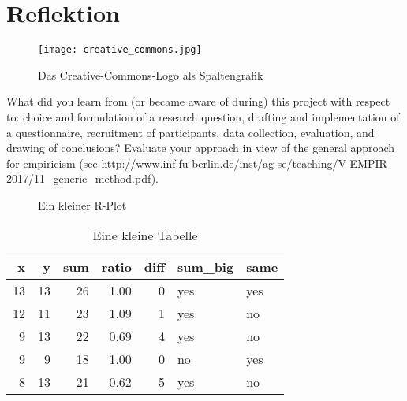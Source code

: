 \documentclass[de]{agse-empir-report}\usepackage[]{graphicx}\usepackage[]{color}
\makeatletter
\newenvironment{kframe}{%
 \def\at@end@of@kframe{}%
 \ifinner\ifhmode%
  \def\at@end@of@kframe{\end{minipage}}%
  \begin{minipage}{\columnwidth}%
 \fi\fi%
 \def\FrameCommand##1{\hskip\@totalleftmargin \hskip-\fboxsep
 \colorbox{shadecolor}{##1}\hskip-\fboxsep
     \hskip-\linewidth \hskip-\@totalleftmargin \hskip\columnwidth}%
 \MakeFramed {\advance\hsize-\width
   \@totalleftmargin\z@ \linewidth\hsize
   \@setminipage}}%
 {\par\unskip\endMakeFramed%
 \at@end@of@kframe}
\newenvironment{knitrout}{}{} %
\makeatother
\begin{document}
\lipsum[9-10]


\section[kk]{Reflektion} \label{sec:reflektion}

\begin{figure}
    \texttt{[image: creative\_commons.jpg]}
    \caption{Das Creative-Commons-Logo als Spaltengrafik}
\end{figure}

What did you learn from (or became aware of during) this project with
respect to: choice and formulation of a research question,
drafting and implementation of a questionnaire,
recruitment of participants,
data collection, evaluation, and drawing of conclusions?
Evaluate your approach in view of the general approach for
empiricism (see
\url{http://www.inf.fu-berlin.de/inst/ag-se/teaching/V-EMPIR-2017/11_generic_method.pdf}).

\lipsum[11-13]

\begin{figure}
\begin{knitrout}
\color{fgcolor}\begin{kframe}


{\ttfamily\noindent\bfseries{}}

{\ttfamily\noindent\bfseries{}}

{\ttfamily\noindent\bfseries\color{errorcolor}{\#\# Error in print(plt): Objekt 'plt' nicht gefunden}}\end{kframe}
\end{knitrout}
    \caption{Ein kleiner R-Plot}
\end{figure}

\begin{table}
    \centering
\begin{knitrout}
\color{fgcolor}
\begin{tabular}{rrrrrll}
\toprule
x & y & sum & ratio & diff & sum\_big & same\\
\midrule
13 & 13 & 26 & 1.00 & 0 & yes & yes\\
12 & 11 & 23 & 1.09 & 1 & yes & no\\
9 & 13 & 22 & 0.69 & 4 & yes & no\\
9 & 9 & 18 & 1.00 & 0 & no & yes\\
8 & 13 & 21 & 0.62 & 5 & yes & no\\
\bottomrule
\end{tabular}


\end{knitrout}
    \caption{Eine kleine Tabelle}
\end{table}
\end{document}
